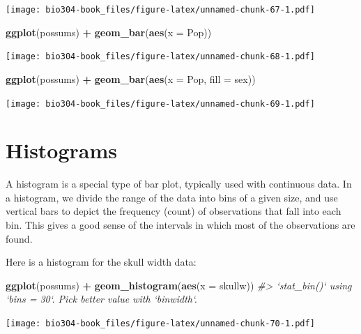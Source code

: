 \documentclass[]{book}
\newenvironment{Shaded}{\begin{snugshade}}{\end{snugshade}}
\newcommand{\CommentTok}[1]{\textcolor[rgb]{0.56,0.35,0.01}{\textit{#1}}}
\newcommand{\DataTypeTok}[1]{\textcolor[rgb]{0.13,0.29,0.53}{#1}}
\newcommand{\KeywordTok}[1]{\textcolor[rgb]{0.13,0.29,0.53}{\textbf{#1}}}
\newcommand{\NormalTok}[1]{#1}
\newcommand{\OperatorTok}[1]{\textcolor[rgb]{0.81,0.36,0.00}{\textbf{#1}}}
\newcommand{\StringTok}[1]{\textcolor[rgb]{0.31,0.60,0.02}{#1}}
\theoremstyle{definition}
\theoremstyle{definition}
\theoremstyle{definition}
\theoremstyle{remark}
\begin{document}
\texttt{[image: bio304-book\_files/figure-latex/unnamed-chunk-67-1.pdf]}

\begin{Shaded}
\begin{Highlighting}[]
\KeywordTok{ggplot}\NormalTok{(possums) }\OperatorTok{+}\StringTok{ }\KeywordTok{geom_bar}\NormalTok{(}\KeywordTok{aes}\NormalTok{(}\DataTypeTok{x =}\NormalTok{ Pop))}
\end{Highlighting}
\end{Shaded}

\texttt{[image: bio304-book\_files/figure-latex/unnamed-chunk-68-1.pdf]}

\begin{Shaded}
\begin{Highlighting}[]
\KeywordTok{ggplot}\NormalTok{(possums) }\OperatorTok{+}\StringTok{ }\KeywordTok{geom_bar}\NormalTok{(}\KeywordTok{aes}\NormalTok{(}\DataTypeTok{x =}\NormalTok{ Pop, }\DataTypeTok{fill =}\NormalTok{ sex))}
\end{Highlighting}
\end{Shaded}

\texttt{[image: bio304-book\_files/figure-latex/unnamed-chunk-69-1.pdf]}

\hypertarget{histograms}{%
\section{Histograms}\label{histograms}}

A histogram is a special type of bar plot, typically used with
continuous data. In a histogram, we divide the range of the data into
bins of a given size, and use vertical bars to depict the frequency
(count) of observations that fall into each bin. This gives a good sense
of the intervals in which most of the observations are found.

Here is a histogram for the skull width data:

\begin{Shaded}
\begin{Highlighting}[]
\KeywordTok{ggplot}\NormalTok{(possums) }\OperatorTok{+}\StringTok{ }\KeywordTok{geom_histogram}\NormalTok{(}\KeywordTok{aes}\NormalTok{(}\DataTypeTok{x =}\NormalTok{ skullw))}
\CommentTok{#> `stat_bin()` using `bins = 30`. Pick better value with `binwidth`.}
\end{Highlighting}
\end{Shaded}

\texttt{[image: bio304-book\_files/figure-latex/unnamed-chunk-70-1.pdf]}
\end{document}
